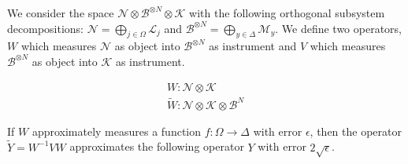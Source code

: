 \begin{theorem}
\label{thm:coherent}
We consider the space
$\mathcal{N} \otimes \mathcal{B}^{\otimes N} \otimes \mathcal{K}$ with the
following orthogonal subsystem decompositions:
$\mathcal{N} = \bigoplus_{j \in \Omega} \mathcal{L}_j$ and
$\mathcal{B}^{\otimes N} = \bigoplus_{y \in \Delta} \mathcal{M}_y$. We
define two operators, $W$ which measures $\mathcal{N}$ as object into
$\mathcal{B}^{\otimes N}$ as instrument and $V$ which measures
$\mathcal{B}^{\otimes N}$ as object into $\mathcal{K}$ as instrument.

\begin{eqnarray}
W : \mathcal{N} \otimes \mathcal{K}\\
\tilde{W} : \mathcal{N} \otimes \mathcal{K} \otimes \mathcal{B}^N
\end{eqnarray}

If $W$ approximately measures a function $f : \Omega \rightarrow \Delta$
with error $\epsilon$, then the operator $\tilde{Y} = W^{-1}VW$ approximates
the following operator $Y$ with error $2\sqrt{\epsilon}$.
\end{theorem}

